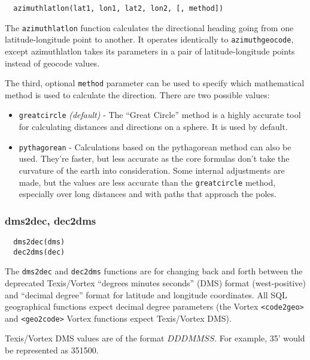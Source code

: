 \begin{verbatim}
  azimuthlatlon(lat1, lon1, lat2, lon2, [, method])
\end{verbatim}

The \verb`azimuthlatlon` function calculates the directional heading
going from one latitude-longitude point to another.  It operates
identically to \verb`azimuthgeocode`, except azimuthlatlon takes its
parameters in a pair of latitude-longitude points instead of geocode
values.

The third, optional \verb`method` parameter can be used to specify
which mathematical method is used to calculate the direction.  There
are two possible values:

\begin{itemize}
\item \verb`greatcircle` {\em(default)} - The ``Great Circle'' method
is a highly accurate tool for calculating distances and directions on
a sphere.  It is used by default.

\item \verb`pythagorean` - Calculations based on the pythagorean
method can also be used.  They're faster, but less accurate as the
core formulas don't take the curvature of the earth into
consideration.  Some internal adjustments are made, but the values are
less accurate than the \verb`greatcircle` method, especially over long
distances and with paths that approach the poles.

\end{itemize}

\subsubsection{dms2dec, dec2dms}

\begin{verbatim}
  dms2dec(dms)
  dec2dms(dec)
\end{verbatim}

The \verb`dms2dec` and \verb`dec2dms` functions are for changing back
and forth between the deprecated Texis/Vortex ``degrees minutes
seconds'' (DMS) format (west-positive) and ``decimal degree'' format
for latitude and longitude coordinates.  All SQL geographical functions
expect decimal degree parameters (the Vortex \verb`<code2geo>` and
\verb`<geo2code>` Vortex functions expect Texis/Vortex DMS).

Texis/Vortex DMS values are of the format $DDDMMSS$.  For example,
35' would be represented as 351500.

